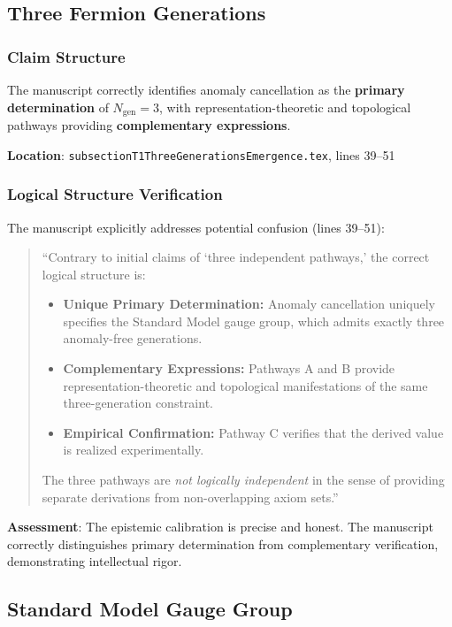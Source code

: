 \documentclass[11pt,a4paper]{article}
\theoremstyle{definition}
\begin{document}
\subsection{Three Fermion Generations}

\subsubsection{Claim Structure}

The manuscript correctly identifies anomaly cancellation as the \textbf{primary determination} of $N_{\text{gen}} = 3$, with representation-theoretic and topological pathways providing \textbf{complementary expressions}.

\textbf{Location}: \texttt{subsectionT1ThreeGenerationsEmergence.tex}, lines 39--51

\subsubsection{Logical Structure Verification}

The manuscript explicitly addresses potential confusion (lines 39--51):

\begin{quote}
``Contrary to initial claims of `three independent pathways,' the correct logical structure is:
\begin{itemize}
    \item \textbf{Unique Primary Determination:} Anomaly cancellation uniquely specifies the Standard Model gauge group, which admits exactly three anomaly-free generations.
    \item \textbf{Complementary Expressions:} Pathways A and B provide representation-theoretic and topological manifestations of the same three-generation constraint.
    \item \textbf{Empirical Confirmation:} Pathway C verifies that the derived value is realized experimentally.
\end{itemize}
The three pathways are \emph{not logically independent} in the sense of providing separate derivations from non-overlapping axiom sets.''
\end{quote}

\textbf{Assessment}: The epistemic calibration is precise and honest. The manuscript correctly distinguishes primary determination from complementary verification, demonstrating intellectual rigor.

\subsection{Standard Model Gauge Group}
\end{document}

